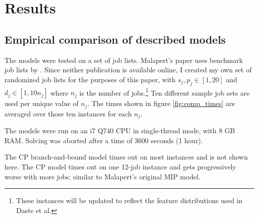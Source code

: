 \newpage
\chapter{Results}
\section{Empirical comparison of described models}\label{sec:results}
The models were tested on a set of job lists. Malapert's paper uses benchmark
job lists by \citet{daste1, daste2}. Since neither publication is
available online, I created my own set of randomized job lists for the purposes
of this paper, with $s_j, p_j \in [1, 20]$ and $d_j \in [1, 10n_j]$ where $n_j$ is
the number of jobs.\footnote{These instances will be updated to reflect the
feature distributions used in Daste et al.} Ten different sample job sets are
used per unique value of $n_j$. The times shown in figure \ref{fig:comp_times}
are averaged over those ten instances for each $n_j$.

The models were run on an i7 Q740 CPU in single-thread mode, with 8 GB RAM.
Solving was aborted after a time of 3600 seconds (1 hour).

The CP branch-and-bound model times out on most instances and is not shown here.
The CP model times out on one 12-job instance and gets progressively worse with
more jobs; similar to Malapert's original MIP model.



